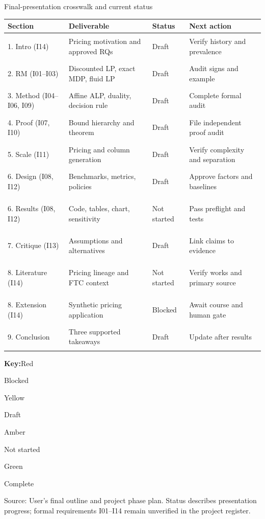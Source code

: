 \documentclass[aspectratio=169,10pt]{beamer}
\newcommand{\src}[1]{\par\vfill{\tiny\color{muted}Source: #1\par}}
\newcommand{\blocked}{\colorbox{statusred}{\strut\color{white}Blocked}}
\newcommand{\draft}{\colorbox{statusyellow}{\strut\color{black}Draft}}
\newcommand{\notstarted}{\colorbox{statusamber}{\strut\color{black}Not started}}
\newcommand{\complete}{\colorbox{statusgreen}{\strut\color{white}Complete}}
\begin{document}
\begin{frame}[t]{Final-presentation crosswalk and current status}
\scriptsize
\begin{tabularx}{\textwidth}{@{}p{}p{}p{}X@{}}
\toprule
Section & Deliverable & Status & Next action\\
\midrule
1. Intro (I14) & Pricing motivation and approved RQs & \draft & Verify history and prevalence\\ \hline
2. RM (I01--I03) & Discounted LP, exact MDP, fluid LP & \draft & Audit signs and example\\ \hline
3. Method (I04--I06, I09) & Affine ALP, duality, decision rule & \draft & Complete formal audit\\ \hline
4. Proof (I07, I10) & Bound hierarchy and theorem & \draft & File independent proof audit\\ \hline
5. Scale (I11) & Pricing and column generation & \draft & Verify complexity and separation\\ \hline
6. Design (I08, I12) & Benchmarks, metrics, policies & \draft & Approve factors and baselines\\ \hline
6. Results (I08, I12) & Code, tables, chart, sensitivity & \notstarted & Pass preflight and tests\\ \hline
7. Critique (I13) & Assumptions and alternatives & \draft & Link claims to evidence\\ \hline
8. Literature (I14) & Pricing lineage and FTC context & \notstarted & Verify works and primary source\\ \hline
8. Extension (I14) & Synthetic pricing application & \blocked & Await course and human gate\\ \hline
9. Conclusion & Three supported takeaways & \draft & Update after results\\
\bottomrule
\end{tabularx}
\vspace{0.7em}\par
\textbf{Key:}\quad Red \blocked\qquad Yellow \draft\qquad Amber \notstarted\qquad Green \complete
\src{User's final outline and project phase plan. Status describes presentation progress; formal requirements I01--I14 remain unverified in the project register.}
\end{frame}
\end{document}

